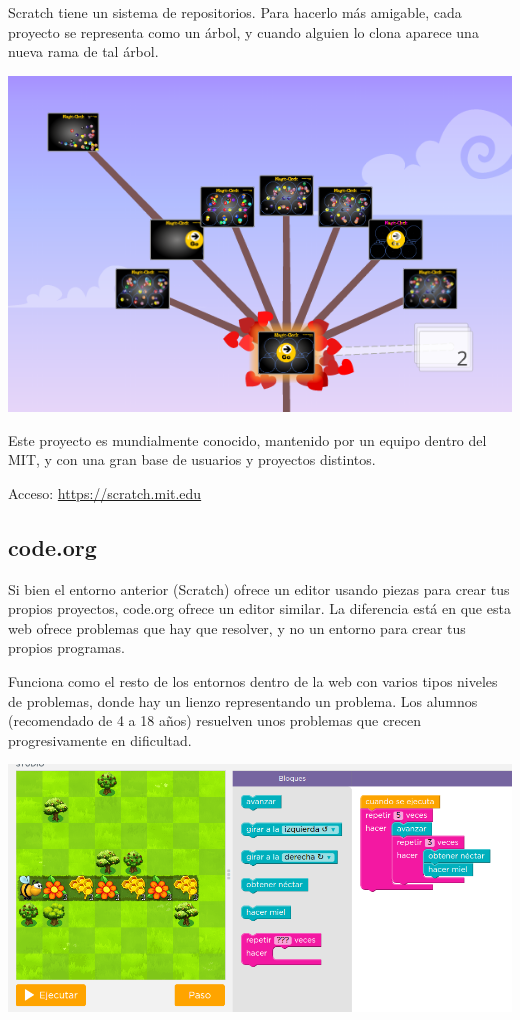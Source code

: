 \documentclass{report}
\begin{document}
	\vspace{10px}
	
	Scratch tiene un sistema de repositorios. Para hacerlo más amigable, cada proyecto se representa como un árbol, y cuando alguien lo clona aparece una nueva rama de tal árbol.
	
	\begin{center}
	\includegraphics[width=0.7\linewidth]{scratch2}
	\end{center}
	
	Este proyecto es mundialmente conocido, mantenido por un equipo dentro del MIT, y con una gran base de usuarios y proyectos distintos.
	
	Acceso: \url{https://scratch.mit.edu}
	
	\subsection{code.org}
	
	Si bien el entorno anterior (Scratch) ofrece un editor usando piezas para crear tus propios proyectos, code.org ofrece un editor similar. La diferencia está en que esta web ofrece problemas que hay que resolver, y no un entorno para crear tus propios programas.
	
	Funciona como el resto de los entornos dentro de la web con varios tipos niveles de problemas, donde hay un lienzo representando un problema. Los alumnos (recomendado de 4 a 18 años) resuelven unos problemas que crecen progresivamente en dificultad. 
	
	\begin{center}
	\includegraphics[width=0.7\linewidth]{codeorg}
	\end{center}
	
\end{document}
